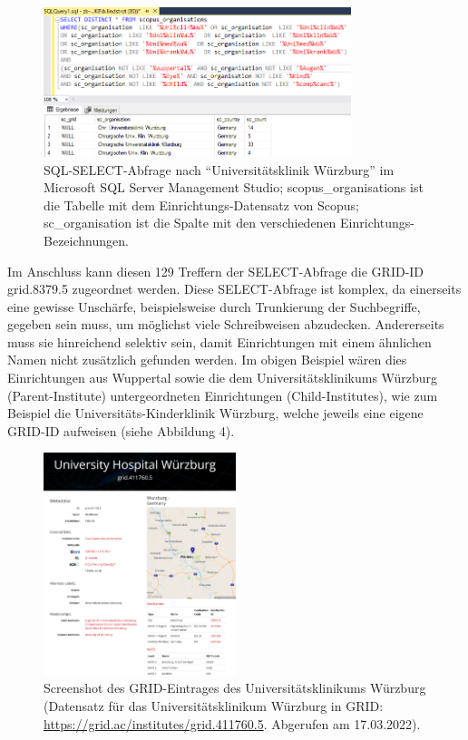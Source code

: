 \documentclass[a4paper,
fontsize=11pt,
oneside,
numbers=noperiodatend,
parskip=half-,
bibliography=totoc,
final
]{scrartcl}
\begin{document}
\begin{figure}
\centering
\includegraphics[width=0.8\textwidth]{img/Abb_3_SQL_Abfrage_Uni_Wuerzburg.png}
\caption{SQL-SELECT-Abfrage nach \enquote{Universitätsklinik Würzburg}
im Microsoft SQL Server Management Studio; scopus\_organisations ist die
Tabelle mit dem Einrichtungs-Datensatz von Scopus; sc\_organisation ist
die Spalte mit den verschiedenen Einrichtungs-Bezeichnungen.}
\end{figure}

Im Anschluss kann diesen 129 Treffern der SELECT-Abfrage die GRID-ID
grid.8379.5 zugeordnet werden. Diese SELECT-Abfrage ist komplex, da
einerseits eine gewisse Unschärfe, beispielsweise durch Trunkierung der
Suchbegriffe, gegeben sein muss, um möglichst viele Schreibweisen
abzudecken. Andererseits muss sie hinreichend selektiv sein, damit
Einrichtungen mit einem ähnlichen Namen nicht zusätzlich gefunden
werden. Im obigen Beispiel wären dies Einrichtungen aus Wuppertal sowie
die dem Universitätsklinikums Würzburg (Parent-Institute)
untergeordneten Einrichtungen (Child-Institutes), wie zum Beispiel die
Universitäts-Kinderklinik Würzburg, welche jeweils eine eigene GRID-ID
aufweisen (siehe Abbildung 4).

\begin{figure}
\centering
\includegraphics[width=0.5\textwidth]{img/Abb_4_Grid.png}
\caption{Screenshot des GRID-Eintrages des Universitätsklinikums
Würzburg (Datensatz für das Universitätsklinikum Würzburg in GRID:
\url{https://grid.ac/institutes/grid.411760.5}. Abgerufen am
17.03.2022).}
\end{figure}
\end{document}
